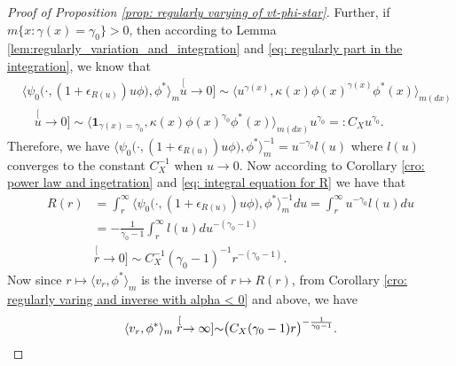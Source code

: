 \documentclass[12pt, a4paper]{amsart}
\theoremstyle{definition}
\numberwithin{equation}{section}
\begin{document}
\begin{proof}[Proof of Proposition \ref{prop: regularly varying of vt-phi-star}]
	Further, if $m\{x: \gamma(x) = \gamma_0\}> 0$, then according to Lemma \ref{lem:regularly_variation_and_integration} and \eqref{eq: regularly part in the integration}, we know that
\begin{equation}\begin{split}
	&\big\langle \psi_0 \big(\cdot,( 1 + \epsilon_{R(u)} ) u \phi \big), \phi^* \big\rangle_m
	\stackrel[u\to 0]{}{\sim}  \langle u^{\gamma(x)} , \kappa (x)\phi(x)^{\gamma(x)} \phi^*(x)
	\rangle_{m(dx)}
	\\ &\quad \stackrel[u\to 0]{}{\sim}  \langle \mathbf 1_{\gamma(x)= \gamma_0}, \kappa (x)\phi(x)^{\gamma_0} \phi^*(x)
	\rangle_{m(dx)} u^{\gamma_0}
	=: C_X u^{\gamma_0}.
\end{split}\end{equation}
	Therefore, we have $\big\langle \psi_0 \big(\cdot,( 1 + \epsilon_{R(u)} ) u \phi \big), \phi^* \big\rangle_m^{-1} = u^{-\gamma_0} l(u)$ where $l(u)$ converges to the constant $C_X^{-1}$ when $u \to 0$.
	Now according to Corollary \ref{cro: power law and ingetration} and \eqref{eq: integral equation for R} we have that
\begin{equation}\begin{split}
	R(r)
	&= \int_r^\infty \big\langle \psi_0 \big(\cdot,( 1 + \epsilon_{R(u)} ) u \phi \big), \phi^* \big\rangle_m^{-1} du
	= \int_r^\infty u^{-\gamma_0} l(u) du
	\\&= -\frac{1}{\gamma_0-1}\int_r^\infty l(u) du^{-(\gamma_0 - 1)}
	\\&\stackrel[r\to 0]{}{\sim} C_X^{-1} (\gamma_0-1)^{-1} r^{-(\gamma_0 - 1)}.
\end{split}\end{equation}
	Now since $r\mapsto \langle v_r,\phi^*\rangle_m$ is the inverse of $r\mapsto R(r)$, from Corollary \ref{cro: regularly varing and inverse with alpha < 0} and above,
	we have
\begin{equation}
	\langle v_r,\phi^*\rangle_m
	\stackrel[r\to \infty]{}{\sim} \big(C_X (\gamma_0-1) r \big)^{-\frac{1}{\gamma_0 - 1}}. \qedhere
\end{equation}
\end{proof}
\end{document}
